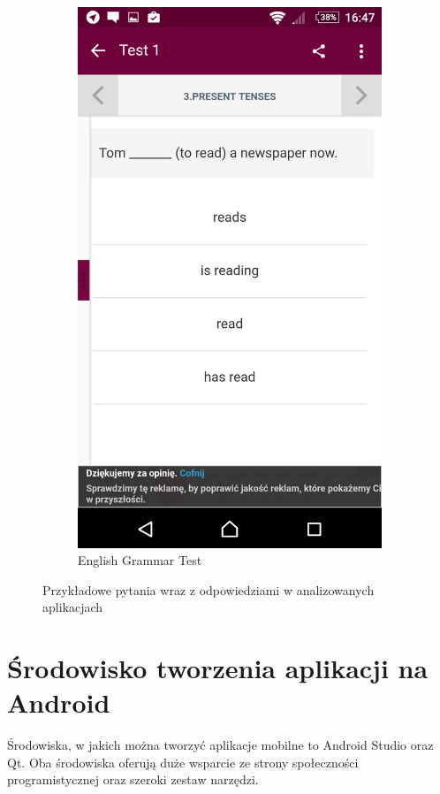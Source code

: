 \documentclass[eng]{mgr}
\begin{document}
\begin{figure}[ht]
\begin{subfigure}{.32\textwidth}
				\includegraphics[width=.9\linewidth]{English_Grammar_Test.png}
				\caption{English Grammar Test}
				\label{fig:english_grammar_test}
			\end{subfigure}
			\caption{Przykładowe pytania wraz z odpowiedziami w analizowanych aplikacjach}
			\label{fig:przykladowe_aplikacje}
		\end{figure}
	
		\section{Środowisko tworzenia aplikacji na Android}
		Środowiska, w jakich można tworzyć aplikacje mobilne to Android Studio oraz Qt. Oba środowiska oferują duże wsparcie ze strony społeczności programistycznej oraz szeroki zestaw narzędzi.
		
\end{document}
